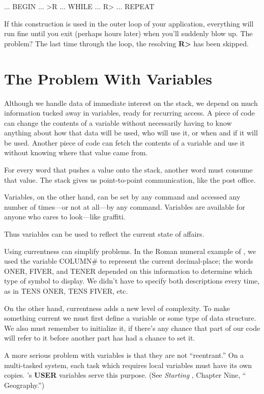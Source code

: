 \begin{Code}
... BEGIN ... >R ... WHILE ... R> ... REPEAT
\end{Code}
If this construction is used in the outer loop of your application,
everything will run fine until you exit (perhaps hours later) when you'll
suddenly blow up. The problem? The last time through the loop, the
resolving \textbf{R>} has been skipped.

\section{The Problem With Variables}

Although we handle data of immediate interest on the stack, we depend
on much information tucked away in variables, ready for recurring access.
A piece of code can change the contents of a variable without
necessarily having to know anything about how that data will be used,
who will use it, or when and if it will be used. Another piece of code can
fetch the contents of a variable and use it without knowing where that
value came from.

For every word that pushes a value onto the stack, another word
must consume that value. The stack gives us point-to-point communication,
like the post office.

Variables, on the other hand, can be set by any command and accessed
any number of times---or not at all---by any command. Variables
are available for anyone who cares to look---like graffiti.

Thus variables can be used to reflect the current state of affairs.

Using currentness can simplify problems. In the Roman numeral example
of , we used the variable COLUMN\# to represent the
current decimal-place; the words ONER, FIVER, and TENER depended
on this information to determine which type of symbol to display. We
didn't have to specify both descriptions every time, as in TENS ONER,
TENS FIVER, etc.

On the other hand, currentness adds a new level of complexity. To
make something current we must first define a variable or some type of
data structure. We also must remember to initialize it, if there's any
chance that part of our code will refer to it before another part has had a
chance to set it.

A more serious problem with variables is that they are not ``reentrant.''
On a multi-tasked \Forth{} system, each task which requires
local variables must have its own copies. \Forth{}'s \textbf{USER} variables
serve this purpose. (See \emph{Starting \Forth{}}, Chapter Nine, ``\Forth{}
Geography.'')

